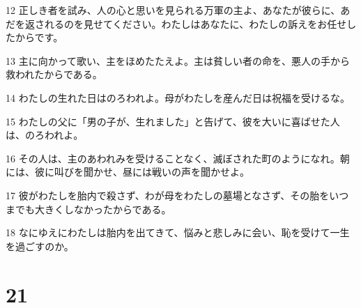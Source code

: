 \par 12 正しき者を試み、人の心と思いを見られる万軍の主よ、あなたが彼らに、あだを返されるのを見せてください。わたしはあなたに、わたしの訴えをお任せしたからです。
\par 13 主に向かって歌い、主をほめたたえよ。主は貧しい者の命を、悪人の手から救われたからである。
\par 14 わたしの生れた日はのろわれよ。母がわたしを産んだ日は祝福を受けるな。
\par 15 わたしの父に「男の子が、生れました」と告げて、彼を大いに喜ばせた人は、のろわれよ。
\par 16 その人は、主のあわれみを受けることなく、滅ぼされた町のようになれ。朝には、彼に叫びを聞かせ、昼には戦いの声を聞かせよ。
\par 17 彼がわたしを胎内で殺さず、わが母をわたしの墓場となさず、その胎をいつまでも大きくしなかったからである。
\par 18 なにゆえにわたしは胎内を出てきて、悩みと悲しみに会い、恥を受けて一生を過ごすのか。

\chapter{21}

